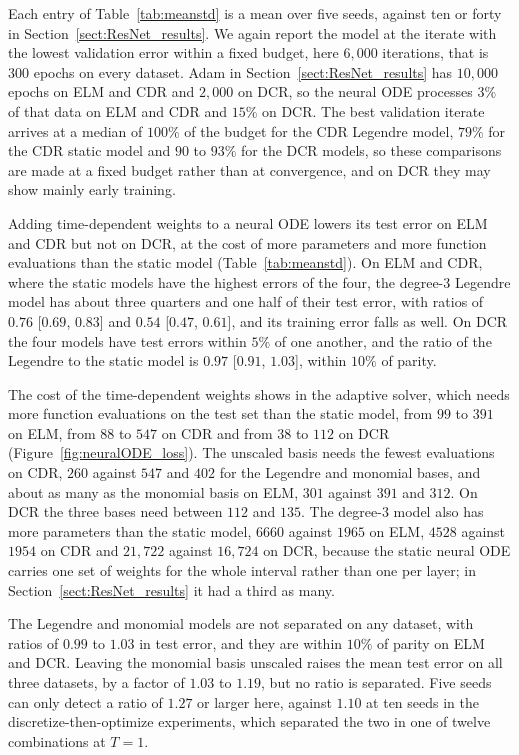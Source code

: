 \documentclass[pdflatex,sn-mathphys-num]{sn-jnl}%
\theoremstyle{thmstyleone}%
\theoremstyle{thmstyletwo}%
\theoremstyle{thmstylethree}%
\begin{document}
Each entry of Table~\ref{tab:meanstd} is a mean over five seeds, against ten or forty in Section~\ref{sect:ResNet_results}.
%
We again report the model at the iterate with the lowest validation error within a fixed budget, here
$6{,}000$ iterations, that is $300$ epochs on every dataset. Adam in Section~\ref{sect:ResNet_results} has $10{,}000$ epochs on ELM and CDR and $2{,}000$ on DCR, so the neural ODE processes $3\%$ of that data on ELM and CDR and $15\%$ on DCR. The best validation iterate arrives at a median of $100\%$ of the budget for the CDR Legendre
model, $79\%$ for the CDR static model and $90$ to $93\%$ for the DCR models, so these comparisons
are made at a fixed budget rather than at convergence, and on DCR they may show mainly early training.

Adding time-dependent weights to a neural ODE lowers its test error on ELM and CDR but not on DCR, at the cost of more parameters and more function evaluations than the static model (Table~\ref{tab:meanstd}).
On ELM and CDR, where the static models have the highest errors of the four, the degree-$3$ Legendre model has about three quarters and one half of their test error, with ratios of $0.76$ [$0.69$, $0.83$] and $0.54$ [$0.47$, $0.61$], and its training error falls as well. On DCR the four models have test errors within $5\%$ of one another, and the ratio of the Legendre to the static model is $0.97$ [$0.91$, $1.03$], within $10\%$ of parity.

The cost of the time-dependent weights shows in the adaptive solver, which needs more function evaluations on the test set than the static model, from $99$ to $391$ on ELM, from $88$ to $547$ on CDR and from $38$ to $112$ on DCR (Figure~\ref{fig:neuralODE_loss}).
%
The unscaled basis needs the fewest evaluations on CDR, $260$ against $547$ and $402$ for the Legendre and monomial bases, and about as many as the monomial basis on ELM, $301$ against $391$ and $312$. On DCR the three bases need between $112$ and $135$. The degree-$3$ model also has more parameters than the static model, $6660$ against $1965$ on ELM, $4528$ against $1954$ on CDR and $21{,}722$ against $16{,}724$ on DCR, because the static neural ODE carries one set of weights for the whole interval rather than one per layer; in Section~\ref{sect:ResNet_results} it had a third as many.

The Legendre and monomial models are not separated on any dataset, with ratios of $0.99$ to $1.03$ in test error, and they are within $10\%$ of parity on ELM and DCR.
%
Leaving the monomial basis unscaled raises the mean test error on all three datasets, by a factor of $1.03$ to $1.19$, but no ratio is separated. Five seeds can only detect a ratio of $1.27$ or larger here, against $1.10$ at ten seeds in the discretize-then-optimize experiments, which separated the two in one of twelve combinations at $T=1$.
\end{document}
